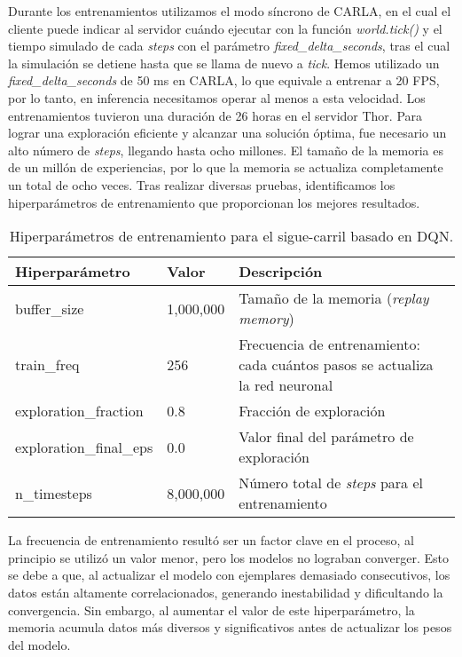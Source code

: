 Durante los entrenamientos utilizamos el modo síncrono de CARLA, en el cual el cliente puede indicar al servidor cuándo ejecutar con la función  \textit{world.tick()} y el tiempo simulado de cada \textit{steps} con el parámetro \textit{fixed\_delta\_seconds}, tras el cual la simulación se detiene hasta que se llama de nuevo a \textit{tick}. Hemos utilizado un \textit{fixed\_delta\_seconds} de 50 ms en CARLA, lo que equivale a entrenar a 20 \ac{FPS}, por lo tanto, en inferencia necesitamos operar al menos a esta velocidad. Los entrenamientos tuvieron una duración de 26 horas en el servidor Thor. Para lograr una exploración eficiente y alcanzar una solución óptima, fue necesario un alto número de \textit{steps}, llegando hasta ocho millones. El tamaño de la memoria es de un millón de experiencias, por lo que la memoria se actualiza completamente un total de ocho veces. Tras realizar diversas pruebas, identificamos los hiperparámetros de entrenamiento que proporcionan los mejores resultados.
\begin{table}[ht]
\centering
\renewcommand{\arraystretch}{1.2} %
\begin{tabular}{|l|l|p{9cm}|} %
\hline
\textbf{Hiperparámetro} & \textbf{Valor} & \textbf{Descripción} \\ \hline
buffer\_size & 1,000,000 & Tamaño de la memoria (\textit{replay memory}) \\ \hline
train\_freq & 256 & Frecuencia de entrenamiento: cada cuántos pasos se actualiza la red neuronal \\ \hline
exploration\_fraction & 0.8 & Fracción de exploración \\ \hline
exploration\_final\_eps & 0.0 & Valor final del parámetro de exploración \\ \hline
n\_timesteps & 8,000,000 & Número total de \textit{steps} para el entrenamiento \\ \hline
\end{tabular}
\caption{Hiperparámetros de entrenamiento para el sigue-carril basado en \ac{DQN}.}
\label{tab:hiperparametros}
\end{table}

La frecuencia de entrenamiento resultó ser un factor clave en el proceso, al principio se utilizó un valor menor, pero los modelos no lograban converger. Esto se debe a que, al actualizar el modelo con ejemplares demasiado consecutivos, los datos están altamente correlacionados, generando inestabilidad y dificultando la convergencia. Sin embargo, al aumentar el valor de este hiperparámetro, la memoria acumula datos más diversos y significativos antes de actualizar los pesos del modelo.

